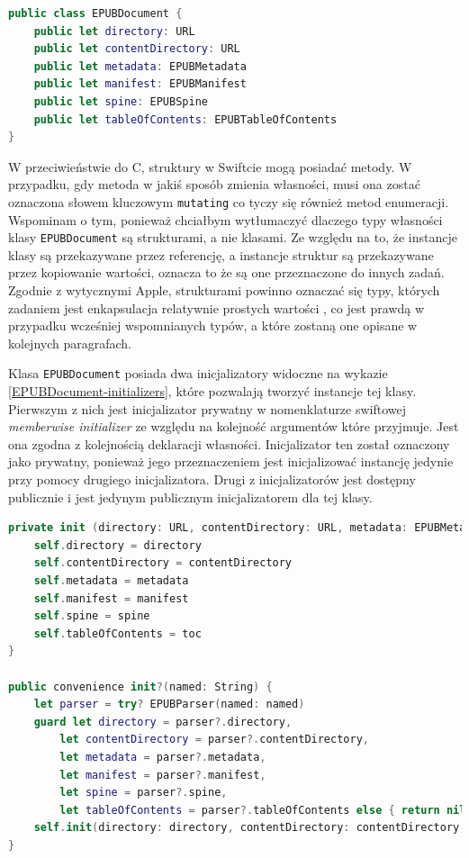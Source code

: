 \begin{lstlisting}[caption={Klasa EPUBDocument i jej stałe publiczne}, language=swift,label=EPUBDocument-declaration]
public class EPUBDocument {
    public let directory: URL
    public let contentDirectory: URL
    public let metadata: EPUBMetadata
    public let manifest: EPUBManifest
    public let spine: EPUBSpine
    public let tableOfContents: EPUBTableOfContents
}
\end{lstlisting}

W przeciwieństwie do C, struktury w Swiftcie mogą posiadać metody. W przypadku, gdy metoda w jakiś sposób zmienia własności, musi ona zostać oznaczona słowem kluczowym \texttt{mutating} co tyczy się również metod enumeracji. Wspominam o tym, ponieważ chciałbym wytłumaczyć dlaczego typy własności klasy \texttt{EPUBDocument} są strukturami, a nie klasami. Ze względu na to, że instancje klasy są przekazywane przez referencję, a instancje struktur są przekazywane przez kopiowanie wartości, oznacza to że są one przeznaczone do innych zadań. Zgodnie z wytycznymi Apple, strukturami powinno oznaczać się typy, których zadaniem jest enkapsulacja relatywnie prostych wartości \cite{theSwiftProgrammingLanguageStructsPurpose}, co jest prawdą w przypadku wcześniej wspomnianych typów, a które zostaną one opisane w kolejnych paragrafach.

Klasa \texttt{EPUBDocument} posiada dwa inicjalizatory widoczne na wykazie \ref{EPUBDocument-initializers}, które pozwalają tworzyć instancje tej klasy. Pierwszym z nich jest inicjalizator prywatny w nomenklaturze swiftowej \textit{memberwise initializer} ze względu na kolejność argumentów które przyjmuje. Jest ona zgodna  z kolejnością deklaracji własności. Inicjalizator ten został oznaczony jako prywatny, ponieważ jego przeznaczeniem jest inicjalizować instancję jedynie przy pomocy drugiego inicjalizatora. Drugi z inicjalizatorów jest dostępny publicznie i jest jedynym publicznym inicjalizatorem dla tej klasy.

\begin{lstlisting}[caption={Inicjalizatory klasy EPUBDocument}, language=swift,label=EPUBDocument-initializers]
private init (directory: URL, contentDirectory: URL, metadata: EPUBMetadata, manifest: EPUBManifest, spine: EPUBSpine, toc: EPUBTableOfContents) {
    self.directory = directory
    self.contentDirectory = contentDirectory
    self.metadata = metadata
    self.manifest = manifest
    self.spine = spine
    self.tableOfContents = toc
}

public convenience init?(named: String) {
    let parser = try? EPUBParser(named: named)
    guard let directory = parser?.directory,
        let contentDirectory = parser?.contentDirectory,
        let metadata = parser?.metadata,
        let manifest = parser?.manifest,
        let spine = parser?.spine,
        let tableOfContents = parser?.tableOfContents else { return nil }
    self.init(directory: directory, contentDirectory: contentDirectory, metadata: metadata, manifest: manifest, spine: spine, toc: tableOfContents)
}
\end{lstlisting}

